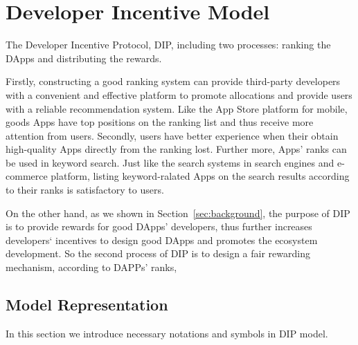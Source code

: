 \section{Developer Incentive Model}
The Developer Incentive Protocol, DIP, including two processes: ranking the DApps and distributing the rewards. 

Firstly, constructing a good ranking system can provide third-party developers with a convenient and effective  platform to promote allocations and provide users with a reliable recommendation system. Like the App Store platform for mobile, goods Apps have top positions on the ranking list and thus receive more attention from users. Secondly, users have better experience when their obtain high-quality Apps directly from the ranking lost. Further more, Apps' ranks can be used in keyword search. Just like the search systems in search engines and e-commerce platform,  listing keyword-ralated Apps on the search results according to their ranks is satisfactory to users. 

On the other hand, as we shown in Section~\ref{sec:background}, the purpose of DIP is to provide rewards for good DApps' developers, thus further increases developers‘ incentives to design good DApps and promotes the ecosystem development. So the second process of DIP is to design a fair rewarding mechanism, according to DAPPs' ranks, 

\subsection{Model Representation}
\label{subsection:parameters}
In this section we introduce necessary notations and symbols in DIP model.

